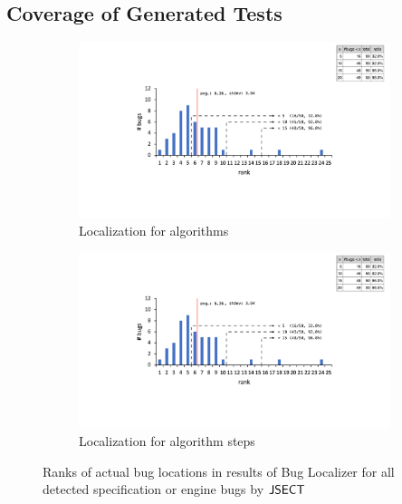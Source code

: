 \subsection{Coverage of Generated Tests}

\begin{figure}[t]
  \centering
  \begin{subfigure}[t]{0.48\textwidth}
    \includegraphics[width=\textwidth]{img/localize.pdf}
    \caption{Localization for algorithms}
    \label{fig:localize-algo}
  \end{subfigure}
  \begin{subfigure}[t]{0.48\textwidth}
    \includegraphics[width=\textwidth]{img/localize.pdf}
    \caption{Localization for algorithm steps}
    \label{fig:localize-step}
  \end{subfigure}
  \caption{Ranks of actual bug locations in results of \textsf{Bug Localizer}
    for all detected specification or engine bugs by $\text{\sf JSECT}$}
  \label{fig:localize}
  \vspace*{-1em}
\end{figure}

